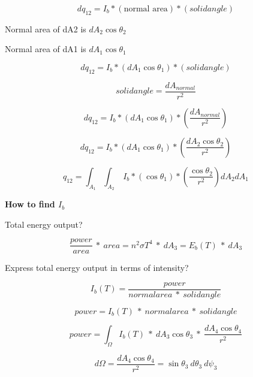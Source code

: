\documentclass[12pt]{article}
\renewcommand{\_}{\kern-1.5pt\textunderscore\kern-1.5pt}
\begin{document}
 \[ dq_{12}=I_{b}\ast \left( \text{normal area} \right) \ast \left( solid angle \right)  \] \par

Normal area of dA2 is  \( dA_{2}\cos  \theta _{2} \) \par

Normal area of dA1 is  \( dA_{1}\cos  \theta _{1} \) \par

 \[ dq_{12}=I_{b}\ast \left( dA_{1}\cos  \theta _{1} \right) \ast \left( solid angle \right)  \] \par

 \[ solid angle=\frac{dA_{normal}}{r^{2}} \] \par

 \[ dq_{12}=I_{b}\ast \left( dA_{1}\cos  \theta _{1} \right) \ast \left( \frac{dA_{normal}}{r^{2}} \right)  \] \par

 \[ dq_{12}=I_{b}\ast \left( dA_{1}\cos  \theta _{1} \right) \ast \left( \frac{dA_{2}\cos  \theta _{2}}{r^{2}} \right)  \] \par

 \[ q_{12}= \int _{A_{1}}^{} \int _{A_{2}}^{}~I_{b}\ast \left( \cos  \theta _{1} \right) \ast \left( \frac{\cos  \theta _{2}}{r^{2}} \right) dA_{2}dA_{1} \] \par

\textbf{How to find  \( I_{b} \) }\par

\par

Total energy output?\par

 \[ \frac{power}{area}~\ast~area=n^{2} \sigma T^{4}~\ast~dA_{3}=E_{b} \left( T \right) ~\ast~dA_{3} \] \par

Express total energy output in terms of intensity?\par

 \[ I_{b} \left( T \right) =\frac{power}{normal area~\ast~solid angle} \] \par

 \[ power=I_{b} \left( T \right) ~\ast~normal area~\ast~solid angle \] \par

 \[ power= \int _{ \Omega }^{}I_{b} \left( T \right) ~\ast~dA_{3}\cos  \theta _{3}~\ast~\frac{dA_{4}\cos  \theta _{4}}{r^{2}} \] \par

 \[ d \Omega =\frac{dA_{4}\cos  \theta _{4}}{r^{2}}=\sin  \theta _{3}~d \theta _{3}~d \psi _{3} \] \par
\end{document}
